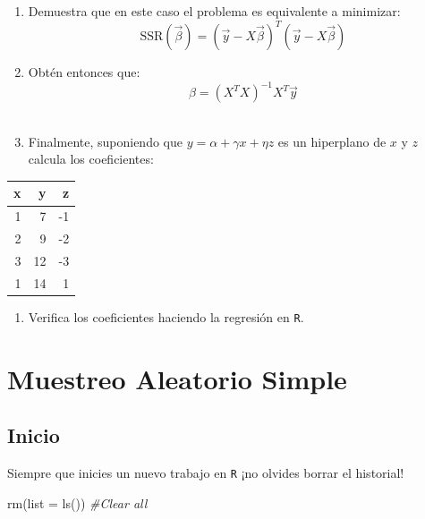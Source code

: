 \documentclass[
]{book}
\newenvironment{Shaded}{\begin{snugshade}}{\end{snugshade}}
\newcommand{\AttributeTok}[1]{\textcolor[rgb]{0.77,0.63,0.00}{#1}}
\newcommand{\CommentTok}[1]{\textcolor[rgb]{0.56,0.35,0.01}{\textit{#1}}}
\newcommand{\FunctionTok}[1]{\textcolor[rgb]{0.00,0.00,0.00}{#1}}
\newcommand{\NormalTok}[1]{#1}
\providecommand{\tightlist}{%
  \setlength{\itemsep}{0pt}\setlength{\parskip}{0pt}}
\begin{document}
\begin{enumerate}
\def\labelenumi{\alph{enumi}.}
\tightlist
\item
  Demuestra que en este caso el problema es equivalente a minimizar:
  \begin{equation}\nonumber
  \text{SSR}(\vec{\beta}) = (\vec{y} - X \vec{\beta})^T (\vec{y} - X \vec{\beta})
  \end{equation}
\item
  Obtén entonces que:
  \begin{equation}\nonumber
  \beta = (X^T X)^{-1} X^T \vec{y}
  \end{equation}\\
\item
  Finalmente, suponiendo que \(y = \alpha + \gamma x + \eta z\) es un hiperplano de \(x\) y \(z\) calcula los coeficientes:
\end{enumerate}

\begin{tabular}{r|r|r}
\hline
x & y & z\\
\hline
1 & 7 & -1\\
\hline
2 & 9 & -2\\
\hline
3 & 12 & -3\\
\hline
1 & 14 & 1\\
\hline
\end{tabular}

\begin{enumerate}
\def\labelenumi{\alph{enumi}.}
\setcounter{enumi}{3}
\tightlist
\item
  Verifica los coeficientes haciendo la regresión en \texttt{R}.
\end{enumerate}

\hypertarget{muestreo-aleatorio-simple}{%
\chapter{Muestreo Aleatorio Simple}\label{muestreo-aleatorio-simple}}

\hypertarget{inicio-1}{%
\section{Inicio}\label{inicio-1}}

Siempre que inicies un nuevo trabajo en \texttt{R} ¡no olvides borrar el historial!

\begin{Shaded}
\begin{Highlighting}[]
\FunctionTok{rm}\NormalTok{(}\AttributeTok{list =} \FunctionTok{ls}\NormalTok{()) }\CommentTok{\#Clear all}
\end{Highlighting}
\end{Shaded}
\end{document}
